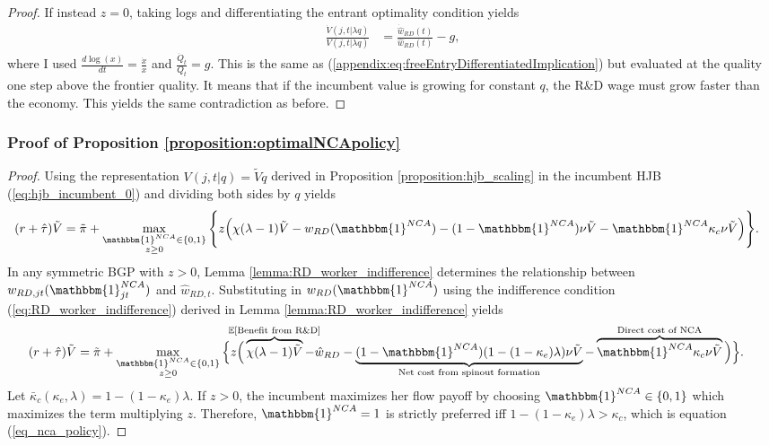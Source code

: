 \documentclass[11pt,english]{article}
\theoremstyle{definition}
\begin{document}
\begin{proof}
	If instead $z = 0$, taking logs and differentiating the entrant optimality condition yields
	\begin{align}
		\frac{\dot{V}(j,t|\lambda q)}{V(j,t|\lambda q)} &= \frac{\dot{\hat{w}}_{RD}(t)}{\hat{w}_{RD}(t)} - g,
	\end{align}
	where I used $\frac{d\log(x)}{dt} = \frac{\dot{x}}{x}$ and $\frac{\dot{Q}_t}{Q_t} = g$. This is the same as (\ref{appendix:eq:freeEntryDifferentiatedImplication}) but evaluated at the quality one step above the frontier quality. It means that if the incumbent value is growing for constant $q$, the R\&D wage must grow faster than the economy. This yields the same contradiction as before. 
\end{proof}

\subsubsection{Proof of Proposition \ref{proposition:optimalNCApolicy}}\label{appendix:proofs:proposition:optimalNCApolicy}

\begin{proof}
	Using the representation $V(j,t|q) = \tilde{V}q$ derived in Proposition \ref{proposition:hjb_scaling} in the incumbent HJB (\ref{eq:hjb_incumbent_0}) and dividing both sides by $q$ yields
	\begin{align*}
		(r + \hat{\tau}) &\tilde{V} = \tilde{\pi} + \max_{\substack{\mathbbm{1}^{NCA} \in \{0,1\} \\ z \ge 0}} \Bigg\{ z \Big( \chi (\lambda -1) \tilde{V}- w_{RD}(\mathbbm{1}^{NCA}) - (1-\mathbbm{1}^{NCA}) \nu \tilde{V} - \mathbbm{1}^{NCA} \kappa_c \nu \tilde{V} \Big)\Bigg\}.
	\end{align*}
	In any symmetric BGP with $z > 0$, Lemma \ref{lemma:RD_worker_indifference} determines the relationship between $w_{RD,jt}(\mathbbm{1}^{NCA}_{jt})$ and $\hat{w}_{RD,t}$.  Substituting in $w_{RD}(\mathbbm{1}^{NCA})$ using the indifference condition (\ref{eq:RD_worker_indifference}) derived in Lemma \ref{lemma:RD_worker_indifference} yields
	\begin{align*}
		(r + \hat{\tau}) \tilde{V} &= \tilde{\pi} + \max_{\substack{\mathbbm{1}^{NCA} \in \{0,1\} \\ z \ge 0}} \Big\{z \Big( \overbrace{\chi (\lambda - 1) \tilde{V}}^{\mathclap{\mathbb{E}[\textrm{Benefit from R\&D}]}}- \hat{w}_{RD} -  \underbrace{(1-\mathbbm{1}^{NCA})(1 - (1-\kappa_{e})\lambda)\nu \tilde{V}}_{\mathclap{\text{Net cost from spinout formation}}} - \overbrace{\mathbbm{1}^{NCA} \kappa_{c} \nu \tilde{V}}^{\mathclap{\text{Direct cost of NCA}}}\Big) \Big\}.
	\end{align*}
	Let $\bar{\kappa}_c (\kappa_e, \lambda) = 1 - (1-\kappa_e)\lambda$. If $z > 0$, the incumbent maximizes her flow payoff by choosing $\mathbbm{1}^{NCA} \in \{0,1\}$ which maximizes the term multiplying $z$. Therefore, $\mathbbm{1}^{NCA} = 1$ is strictly preferred iff $1 - (1-\kappa_e) \lambda > \kappa_c$, which is equation (\ref{eq_nca_policy}).
\end{proof}
\end{document}
